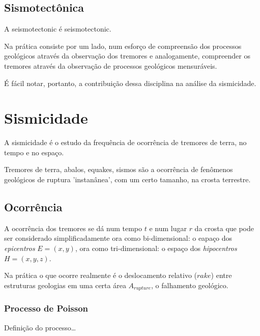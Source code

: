 \subsection{Sismotectônica}
\label{sec:sismotectonica}

A \gls{seismotectonic} é \glsdesc*{seismotectonic}. 

Na prática consiste por um lado, num esforço de compreensão dos
processos geológicos através da observação dos tremores e analogamente, compreender os tremores através da observação
de processos geológicos mensuráveis.  

É fácil notar, portanto, a contribuição dessa disciplina na análise da sismicidade.


\section{Sismicidade}
\label{sec:sismicidade}

A sismicidade é o estudo da frequência de ocorrência de tremores de terra, no
tempo e no espaço.

Tremores de terra, abalos, \glspl{equake}, sismos são a ocorrência de
fenômenos geológicos de ruptura 'instanânea', com um certo tamanho, na
crosta terrestre.


\subsection{Ocorrência}
\label{sec:ocorrencia}
 
A ocorr{\^e}ncia dos tremores se d{\'a} num tempo {$t$} e num lugar {$r$} da
crosta que pode ser considerado simplificadamente ora como
bi-dimensional: o eapaço dos \emph{epicentros} $ E = {(x,y)}$, ora como
tri-dimensional: o espaço dos \emph{hipocentros} $ H = {(x,y,z)}$.

Na prática o que ocorre realmente é o deslocamento relativo (\emph{$rake$})
entre estruturas geologias em uma certa área \emph{$A_{rupture}$}, o falhamento geológico.


\subsubsection{Processo de Poisson}
\label{sec:risco_sismico}

Definição do processo\ldots

